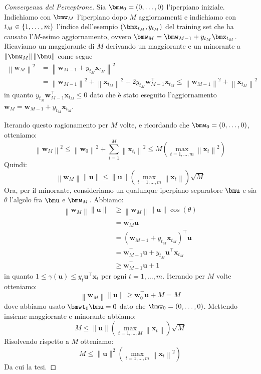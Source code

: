 \documentclass[\main/main.tex]{subfiles}
\begin{document}
\begin{proof}[Convergenza del Perceptrone]
    Sia \(\bmw_0 = \rnd{0,\ldots,0}\) l'iperpiano iniziale. Indichiamo con \(\bmw_M\) l'iperpiano dopo \(M\) aggiornamenti e indichiamo con \(t_M \in \left\{1,\ldots,m\right\}\) l'indice dell'esempio \(\rnd{\bmx_{t_M}, y_{t_M}}\) del training set che ha causato l'\(M\)-esimo aggiornamento, ovvero \(\bmw_M = \bmw_{M-1} + y_{t_M}\bmx_{t_M}\). Ricaviamo un maggiorante di \(M\) derivando un maggiorante e un minorante a \(\norm{\bmw_M}\norm{\bmu}\) come segue
    \begin{align*}
        \left\|\boldsymbol{w}_{M}\right\|^{2}&=\left\|\boldsymbol{w}_{M-1}+y_{t_{M}} \boldsymbol{x}_{t_{M}}\right\|^{2}\\&=\left\|\boldsymbol{w}_{M-1}\right\|^{2}+\left\|\boldsymbol{x}_{t_{M}}\right\|^{2}+2 y_{t_{M}} \boldsymbol{w}_{M-1}^{\top} \boldsymbol{x}_{t_{M}} \leq\left\|\boldsymbol{w}_{M-1}\right\|^{2}+\left\|\boldsymbol{x}_{t_{M}}\right\|^{2}
    \end{align*}
    in quanto \(y_{t_{M}} \boldsymbol{w}_{M-1}^{\top} \boldsymbol{x}_{t_{M}} \leq 0\) dato che è stato eseguito l'aggiornamento \(\boldsymbol{w}_{M}=\boldsymbol{w}_{M-1}+y_{t_{M}} \boldsymbol{x}_{t_{M}}\).
    
    Iterando questo ragionamento per \(M\) volte, e ricordando che \(\bmw_0 = \rnd{0,\ldots,0}\), otteniamo:
    \[\left\|\boldsymbol{w}_{M}\right\|^{2} \leq\left\|\boldsymbol{w}_{0}\right\|^{2}+\sum_{i=1}^{M}\left\|\boldsymbol{x}_{t_{i}}\right\|^{2} \leq M\left(\max _{t=1, \ldots, m}\left\|\boldsymbol{x}_{t}\right\|^{2}\right)\]
    Quindi:
    \[\left\|\boldsymbol{w}_{M}\right\|\|\boldsymbol{u}\| \leq\|\boldsymbol{u}\|\left(\max _{t=1, \ldots, m}\left\|\boldsymbol{x}_{t}\right\|\right) \sqrt{M}\]
    Ora, per il minorante, consideriamo un qualunque iperpiano separatore \(\bmu\) e sia \(\theta\) l'algolo fra \(\bmu\) e \(\bmw_M\). Abbiamo:
    \begin{align*}\left\|\boldsymbol{w}_{M}\right\|\|\boldsymbol{u}\| & \geq\left\|\boldsymbol{w}_{M}\right\|\|\boldsymbol{u}\| \cos (\theta) \\ &=\boldsymbol{w}_{M}^{\top} \boldsymbol{u} \\ &=\left(\boldsymbol{w}_{M-1}+y_{t_{M}} \boldsymbol{x}_{t_{M}}\right)^{\top} \boldsymbol{u} \\ &=\boldsymbol{w}_{M-1}^{\top} \boldsymbol{u}+y_{t_{M}} \boldsymbol{u}^{\top} \boldsymbol{x}_{t_{M}} \\ & \geq \boldsymbol{w}_{M-1}^{\top} \boldsymbol{u}+1 \end{align*}
    in quanto \(1 \leq \gamma(\boldsymbol{u}) \leq y_{t} \boldsymbol{u}^{\top} \boldsymbol{x}_{t}\) per ogni \(t=1,\ldots,m\). Iterando per \(M\) volte otteniamo:
    \[\left\|\boldsymbol{w}_{M}\right\|\|\boldsymbol{u}\| \geq \boldsymbol{w}_{0}^{\top} \boldsymbol{u}+M=M\]
    dove abbiamo usato \(\bmwt_0\bmu = 0\) dato che \(\bmw_0 = \rnd{0,\ldots,0}\). Mettendo insieme maggiorante e minorante abbiamo:
    \[M \leq\|\boldsymbol{u}\|\left(\max _{t=1, \ldots, M}\left\|\boldsymbol{x}_{t}\right\|\right) \sqrt{M}\]
    Risolvendo rispetto a \(M\) otteniamo:
    \[M \leq\|\boldsymbol{u}\|^{2}\left(\max _{t=1, \ldots, m}\left\|\boldsymbol{x}_{t}\right\|^{2}\right)\]
    Da cui la tesi.
    

\end{proof}
\end{document}
